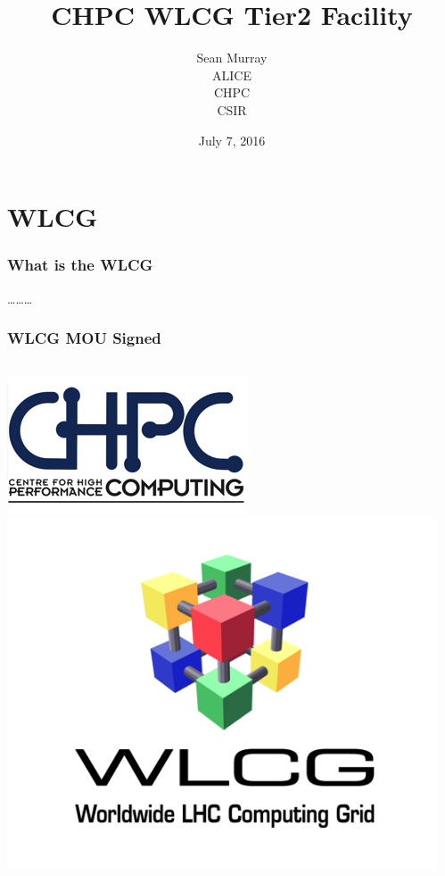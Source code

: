 \documentclass{beamer}
\title{CHPC WLCG Tier2 Facility}
\author{Sean Murray \\
    ALICE \\
    CHPC \\
    CSIR 
}
\date{July 7, 2016}
\begin{document}
\begin{frame}
\titlepage
\end{frame}

\section{WLCG}

\begin{frame}
\frametitle{What is the WLCG}

\ldots\ldots\ldots

\end{frame}

\begin{frame}
\frametitle{WLCG MOU Signed}
\begin{columns}[T] %
\begin{column}{.48\textwidth}
  \includegraphics[scale=0.45]{CHPCLogo.pdf}
  \includegraphics[scale=0.45]{WLCGLogo.pdf}
\end{column}%
\begin{column}{.48\textwidth}
  \centering{
}
\end{column}
\end{columns}
\end{frame}
\end{document}
